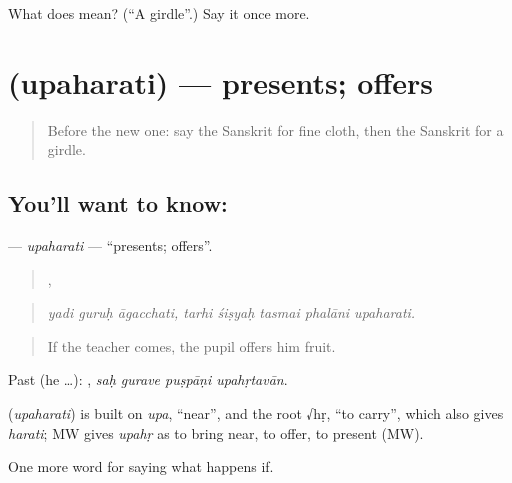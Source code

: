 \begin{tcolorbox}[breakable,colback=teal!4,colframe=teal!35!black,title={Before you move on}]
What does  mean? (\textquotedblleft{}A girdle\textquotedblright{}.) Say it once more.
\end{tcolorbox}
\section[\texorpdfstring{\sk{उपहरति} (upaharati)}{उपहरति (upaharati)}]{ (upaharati) — presents; offers}

\label{lesson:SA-C532-upaharati}



\begin{quote}
Before the new one: say the Sanskrit for fine cloth, then the Sanskrit for a girdle.
\end{quote}

\subsection*{You'll want to know: }
\textbf{} — \emph{upaharati} — \textquotedblleft{}presents; offers\textquotedblright{}.

\begin{quote}
  ,     
\end{quote}

\begin{quote}
\emph{yadi guruḥ āgacchati, tarhi śiṣyaḥ tasmai phalāni upaharati.}
\end{quote}

\begin{quote}
If the teacher comes, the pupil offers him fruit.
\end{quote}

Past (he …):    , \emph{saḥ gurave puṣpāṇi upahṛtavān}.

\begin{cousinweb}
\textbf{} (\emph{upaharati}) is built on \emph{upa}, \textquotedblleft{}near\textquotedblright{}, and the root √hṛ, \textquotedblleft{}to carry\textquotedblright{}, which also gives \emph{harati}; MW gives \emph{upahṛ} as to bring near, to offer, to present (MW).
\end{cousinweb}

\begin{grammarlens}[title={What you've built}]
One more word for saying what happens if.
\end{grammarlens}


